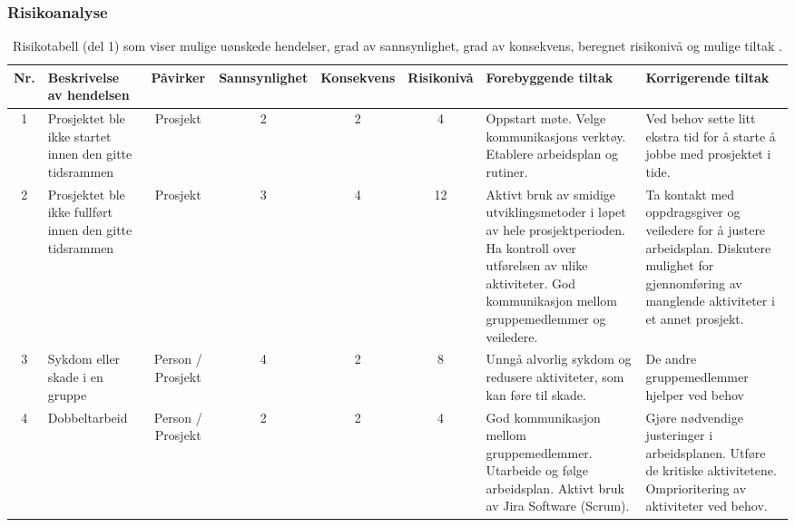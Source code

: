 \begin{landscape}
\subsubsection{Risikoanalyse}
\begin{table}[H]
\begin{tabular}{|c|p{4cm}|c|c|c|c|p{4cm}|p{4cm}|}    
\hline
Nr. & Beskrivelse av hendelsen & Påvirker & Sannsynlighet & Konsekvens & Risikonivå & Forebyggende tiltak & Korrigerende tiltak  \\
\hline\hline
1 & Prosjektet ble ikke startet innen den gitte tidsrammen & Prosjekt & 2 & 2 & 4 & Oppstart møte. Velge kommunikasjons verktøy. Etablere arbeidsplan og rutiner. & Ved behov sette litt ekstra tid for å starte å jobbe med prosjektet i tide. \\
\hline
2 & Prosjektet ble ikke fullført innen den gitte tidsrammen & Prosjekt & 3 & 4 & 12 & Aktivt bruk av smidige utviklingsmetoder i løpet av hele prosjektperioden. Ha kontroll over utførelsen av ulike aktiviteter. God kommunikasjon mellom gruppemedlemmer og veiledere.  & Ta kontakt med oppdragsgiver og veiledere for å justere arbeidsplan. Diskutere mulighet for gjennomføring av manglende aktiviteter i et annet prosjekt.   \\
\hline
3 & Sykdom eller skade i en gruppe & Person / Prosjekt & 4 & 2 & 8 & Unngå alvorlig sykdom og redusere aktiviteter, som kan føre til skade. & De andre gruppemedlemmer hjelper ved behov  \\
\hline
4 & Dobbeltarbeid & Person / Prosjekt & 2 & 2 & 4 & God kommunikasjon mellom gruppemedlemmer. Utarbeide og følge arbeidsplan. Aktivt bruk av Jira Software (Scrum).    & Gjøre nødvendige justeringer i arbeidsplanen. Utføre de kritiske aktivitetene. Omprioritering av aktiviteter ved behov.  \\
\hline
\end{tabular}
\caption{Risikotabell (del 1) som viser mulige uønskede hendelser, grad av sannsynlighet, grad av konsekvens, beregnet risikonivå og mulige tiltak \cite{4-forelesning-risikonalyse}.}
\label{table}
\end{table}
\end{landscape}

